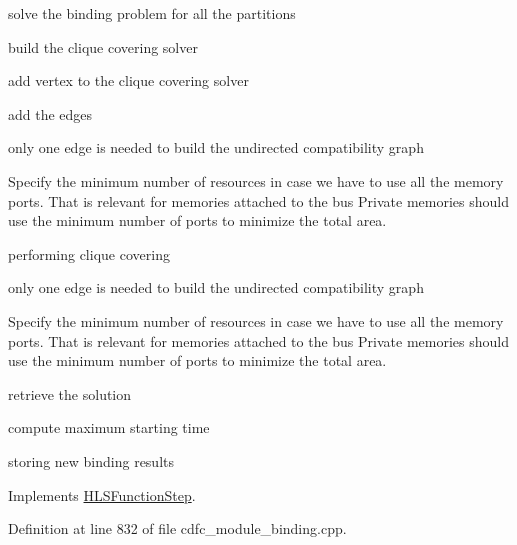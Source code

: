solve the binding problem for all the partitions

build the clique covering solver

add vertex to the clique covering solver

add the edges

only one edge is needed to build the undirected compatibility graph

Specify the minimum number of resources in case we have to use all the memory ports. That is relevant for memories attached to the bus Private memories should use the minimum number of ports to minimize the total area.

performing clique covering

only one edge is needed to build the undirected compatibility graph

Specify the minimum number of resources in case we have to use all the memory ports. That is relevant for memories attached to the bus Private memories should use the minimum number of ports to minimize the total area.

retrieve the solution

compute maximum starting time

storing new binding results 

Implements \hyperlink{classHLSFunctionStep_a8db4c00d080655984d98143206fc9fa8}{H\+L\+S\+Function\+Step}.



Definition at line 832 of file cdfc\+\_\+module\+\_\+binding.\+cpp.



